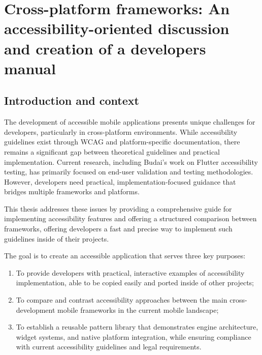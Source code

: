 \chapter{Cross-platform frameworks: An accessibility-oriented discussion and creation of a developers manual}
\label{chap:frameworks}


\section{Introduction and context}
\label{sec:intro-context}

The development of accessible mobile applications presents unique challenges for developers, particularly in cross-platform environments. While accessibility guidelines exist through WCAG and platform-specific documentation, there remains a significant gap between theoretical guidelines and practical implementation. Current research, including Budai's work on Flutter accessibility testing, has primarily focused on end-user validation and testing methodologies. However, developers need practical, implementation-focused guidance that bridges multiple frameworks and platforms.

This thesis addresses these issues by providing a comprehensive guide for implementing accessibility features and offering a structured comparison between frameworks, offering developers a fast and precise way to implement such guidelines inside of their projects.

The goal is to create an accessible application that serves three key purposes:
\begin{enumerate}
    \item To provide developers with practical, interactive examples of accessibility implementation, able to be copied easily and ported inside of other projects;
    \item To compare and contrast accessibility approaches between the main cross-development mobile frameworks in the current mobile landscape;
    \item To establish a reusable pattern library that demonstrates engine architecture, widget systems, and native platform integration, while ensuring compliance with current accessibility guidelines and legal requirements.
\end{enumerate}

